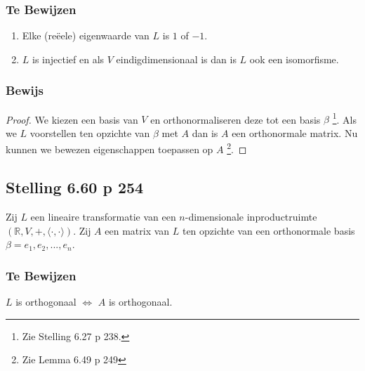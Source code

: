 \documentclass[lineaire_algebra_oplossingen.tex]{subfiles}
\begin{document}
\subsubsection*{Te Bewijzen}
\begin{enumerate}
\item Elke (re\"eele) eigenwaarde van $L$ is $1$ of $-1$.
\item $L$ is injectief en als $V$ eindigdimensionaal is dan is $L$ ook een isomorfisme.
\end{enumerate}
\subsubsection*{Bewijs}
\begin{proof}
We kiezen een basis van $V$ en orthonormaliseren deze tot een basis $\beta$ \footnote{Zie Stelling 6.27 p 238.}. Als we $L$ voorstellen ten opzichte van $\beta$ met $A$ dan is $A$ een orthonormale matrix.
Nu kunnen we bewezen eigenschappen toepassen op $A$ \footnote{Zie Lemma 6.49 p 249}.
\end{proof}

\subsection{Stelling 6.60 p 254}
Zij $L$ een lineaire transformatie van een $n$-dimensionale inproductruimte $(\mathbb{R},V,+,\langle \cdot,\cdot \rangle)$.
Zij $A$ een matrix van $L$ ten opzichte van een orthonormale basis $\beta = e_1,e_2,...,e_n$.

\subsubsection*{Te Bewijzen}
\begin{center}
$L$ is orthogonaal $\Leftrightarrow$ $A$ is orthogonaal.
\end{center}
\end{document}
